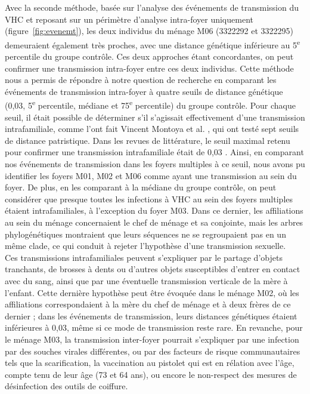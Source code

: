 \documentclass[a4paper,12pt]{article}
\begin{document}
Avec la seconde méthode, basée sur l’analyse des événements de transmission du VHC et reposant sur un périmètre d’analyse intra-foyer uniquement (figure~\ref{fig:evenemt}), les deux individus du ménage M06 (3322292 et 3322295) demeuraient également très proches, avec une distance génétique inférieure au 5\textsuperscript{e} percentile du groupe contrôle. Ces deux approches étant concordantes, on peut confirmer une transmission intra-foyer entre ces deux individus. Cette méthode nous a permis de répondre à notre question de recherche en comparant les événements de transmission intra-foyer à quatre seuils de distance génétique (0,03, 5\textsuperscript{e} percentile, médiane et 75\textsuperscript{e} percentile) du groupe contrôle. Pour chaque seuil, il était possible de déterminer s’il s’agissait effectivement d’une transmission intrafamiliale, comme l’ont fait Vincent Montoya et al. \cite{montoyaDeepSequencingIncreases2016}, qui ont testé sept seuils de distance patristique. Dans les revues de littérature, le seuil maximal retenu pour confirmer une transmission intrafamiliale était de 0,03 \cite{bartlettPatternsCorrelatesHepatitis2022,montoyaDeepSequencingIncreases2016}. Ainsi, en comparant nos événements de transmission dans les foyers multiples à ce seuil, nous avons pu identifier les foyers M01, M02 et M06 comme ayant une transmission au sein du foyer. De plus, en les comparant à la médiane du groupe contrôle, on peut considérer que presque toutes les infections à VHC au sein des foyers multiples étaient intrafamiliales, à l’exception du foyer M03. Dans ce dernier, les affiliations au sein du ménage concernaient le chef de ménage et sa conjointe, mais les arbres phylogénétiques montraient que leurs séquences ne se regroupaient pas en un même clade, ce qui conduit à rejeter l’hypothèse d’une transmission sexuelle. \\ 


Ces transmissions intrafamiliales peuvent s’expliquer par le partage d’objets tranchants, de brosses à dents ou d’autres objets susceptibles d’entrer en contact avec du sang, ainsi que par une éventuelle transmission verticale de la mère à l’enfant. Cette dernière hypothèse peut être évoquée dans le ménage M02, où les affiliations correspondaient à la mère du chef de ménage et à deux frères de ce dernier ; dans les événements de transmission, leurs distances génétiques étaient inférieures à 0,03, même si ce mode de transmission reste rare. En revanche, pour le ménage M03, la transmission inter-foyer pourrait s’expliquer par une infection par des souches virales différentes, ou par des facteurs de risque communautaires tels que la scarification, la vaccination au pistolet qui est en rélation avec l'âge, compte tenu de leur âge (73 et 64 ans), ou encore le non-respect des mesures de désinfection des outils de coiffure. \\ 
\end{document}
